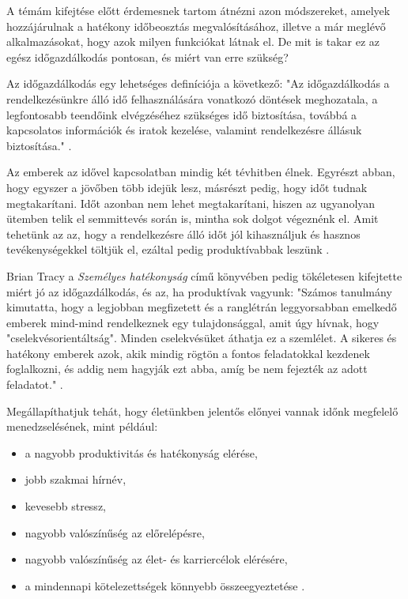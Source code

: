 
A témám kifejtése előtt érdemesnek tartom átnézni azon módszereket, amelyek hozzájárulnak a hatékony időbeosztás megvalósításához, illetve a már meglévő alkalmazásokat, hogy azok milyen funkciókat látnak el. De mit is takar ez az egész időgazdálkodás pontosan, és miért van erre szükség?

Az időgazdálkodás egy lehetséges definíciója a következő: "Az időgazdálkodás a rendelkezésünkre álló idő felhasználására vonatkozó döntések meghozatala, a legfontosabb teendőink elvégzéséhez szükséges idő biztosítása, továbbá a kapcsolatos információk és iratok kezelése, valamint rendelkezésre állásuk biztosítása." \cite{alapok}.

Az emberek az idővel kapcsolatban mindig két tévhitben élnek. Egyrészt abban, hogy egyszer a jövőben több idejük lesz, másrészt pedig, hogy időt tudnak megtakarítani. Időt azonban nem lehet megtakarítani, hiszen az ugyanolyan ütemben telik el semmittevés során is, mintha sok dolgot végeznénk el. Amit tehetünk az az, hogy a rendelkezésre álló időt jól kihasználjuk és hasznos tevékenységekkel töltjük el, ezáltal pedig produktívabbak leszünk \cite{hatekonyido}.

Brian Tracy a \textit{Személyes hatékonyság} című könyvében pedig tökéletesen kifejtette miért jó az időgazdálkodás, és az, ha produktívak vagyunk:
"Számos tanulmány kimutatta, hogy a legjobban megfizetett és a ranglétrán leggyorsabban emelkedő emberek mind-mind rendelkeznek egy tulajdonsággal, amit úgy hívnak, hogy "cselekvésorientáltság". Minden cselekvésüket áthatja ez a szemlélet. A sikeres és hatékony emberek azok, akik mindig rögtön a fontos feladatokkal kezdenek foglalkozni, és addig nem hagyják ezt abba, amíg be nem fejezték az adott feladatot." \cite{brian}.

Megállapíthatjuk tehát, hogy életünkben jelentős előnyei vannak időnk megfelelő menedzselésének, mint például:
\begin{itemize}
\item a nagyobb produktivitás és hatékonyság elérése,
\item jobb szakmai hírnév,
\item kevesebb stressz,
\item nagyobb valószínűség az előrelépésre,
\item nagyobb valószínűség az élet- és karriercélok elérésére,
\item a mindennapi kötelezettségek könnyebb összeegyeztetése \cite{mindtools}.
\end{itemize}

